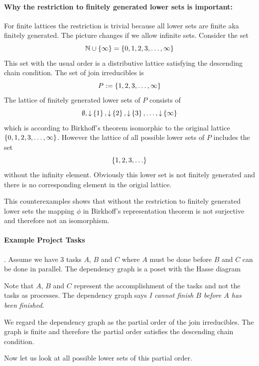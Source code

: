 \paragraph{Why the restriction to finitely generated lower sets is important:}
For finite lattices the restriction is trivial because all lower sets are finite
aka finitely generated. The picture changes if we allow infinite sets. Consider
the set
$$
    \mathbb N \cup \left\{\infty\right\} = \left\{0,1,2,3, \ldots, \infty\right\}
$$
This set with the usual order is a distributive lattice satisfying the
descending chain condition. The set of join irreducibles is
$$
    P := \left\{1,2,3,\ldots, \infty\right\}
$$
The lattice of finitely generated lower sets of $P$ consists of
$$
    \emptyset, {\downarrow}\left\{1\right\}, {\downarrow}\left\{2\right\}, {\downarrow}\left\{3\right\},
    \ldots, {\downarrow}\left\{\infty\right\}
$$
which is according to Birkhoff's theorem isomorphic to the original lattice
$\left\{0,1,2,3,\ldots,\infty\right\}$. However the lattice of all possible lower sets of
$P$ includes the set
$$
    \left\{1,2,3,\ldots\right\}
$$
without the infinity element. Obviously this lower set is not finitely
generated and there is no corresponding element in the origial
lattice.

This counterexamples shows that without the restriction to finitely generated
lower sets the mapping $\phi$ in Birkhoff's representation theorem is not
surjective and therefore not an isomorphism.


\paragraph{Example Project Tasks}. Assume we have 3 tasks $A$, $B$ and $C$ where
$A$ must be done before $B$ and $C$ can be done in parallel. The dependency
graph is a poset with the Hasse diagram


\noindent Note that $A$, $B$ and $C$ represent the accomplishment of the tasks
and not the tasks as processes. The dependency graph says \emph{I cannot finish
$B$ before $A$ has been finished}.

We regard the dependency graph as the partial order of the join irreducibles.
The graph is finite and therefore the partial order satisfies the descending
chain condition.

Now let us look at all possible lower sets of this partial order.

